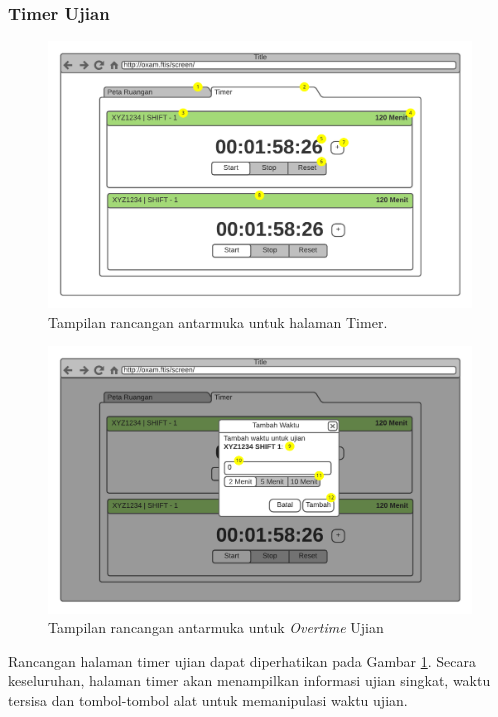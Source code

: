 \subsubsection{Timer Ujian}
    \begin{figure}
        \centering
        \includegraphics[width=0.75\paperwidth]{Gambar/mockups/Mockup--DosenPengawas - Timer.pdf}
        \caption{Tampilan rancangan antarmuka untuk halaman Timer.}
        \label{fig:mockup_dosen_timer}
    \end{figure}
    
    \begin{figure}
        \centering
        \includegraphics[width=0.75\paperwidth]{Gambar/mockups/Mockup--DosenPengawas - Timer + Overtime.pdf}
        \caption{Tampilan rancangan antarmuka untuk \textit{Overtime} Ujian}
        \label{fig:mockup_dosen_overtime}
    \end{figure}
    
    Rancangan halaman timer ujian dapat diperhatikan pada Gambar
    \ref{fig:mockup_dosen_timer}. Secara keseluruhan, halaman timer akan
    menampilkan informasi ujian singkat, waktu tersisa dan tombol-tombol alat
    untuk memanipulasi waktu ujian.
    
